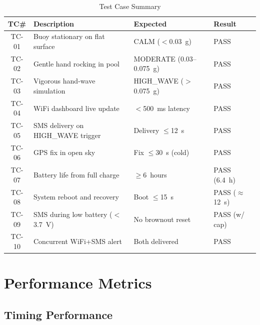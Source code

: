 \begin{table}[H]
\centering
\caption{Test Case Summary}
\label{tab:testcases}
\begin{tabularx}{\textwidth}{c X l l}
\toprule
\textbf{TC\#} & \textbf{Description} & \textbf{Expected} & \textbf{Result} \\
\midrule
TC-01 & Buoy stationary on flat surface   & CALM ($<$0.03~g)        & PASS \\
TC-02 & Gentle hand rocking in pool       & MODERATE (0.03--0.075~g)& PASS \\
TC-03 & Vigorous hand-wave simulation     & HIGH\_WAVE ($>$0.075~g) & PASS \\
TC-04 & WiFi dashboard live update        & $<$500~ms latency       & PASS \\
TC-05 & SMS delivery on HIGH\_WAVE trigger& Delivery $\leq$12~s     & PASS \\
TC-06 & GPS fix in open sky               & Fix $\leq$30~s (cold)   & PASS \\
TC-07 & Battery life from full charge     & $\geq$6~hours           & PASS (6.4~h) \\
TC-08 & System reboot and recovery        & Boot $\leq$15~s         & PASS ($\approx$12~s) \\
TC-09 & SMS during low battery ($<$3.7~V) & No brownout reset       & PASS (w/ cap) \\
TC-10 & Concurrent WiFi+SMS alert         & Both delivered          & PASS \\
\bottomrule
\end{tabularx}
\end{table}

\section{Performance Metrics}

\subsection{Timing Performance}

